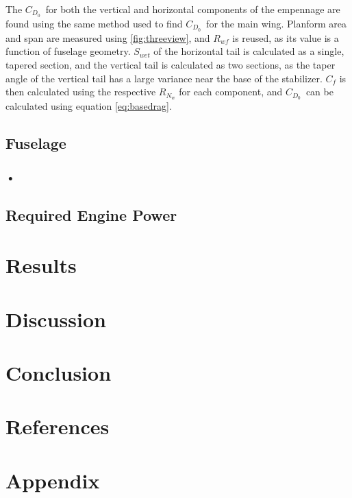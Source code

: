 \documentclass[11pt]{report}
\newcommand{\cdo}{$C_{D_0}$}
\begin{document}
The \cdo\ for both the vertical and horizontal components of the empennage are found using the same method used to find \cdo\ for the main wing. Planform area and span are measured using \ref{fig:threeview}, and $R_{wf}$ is reused, as its value is a function of fuselage geometry. $S_{wet}$ of the horizontal tail is calculated as a single, tapered section, and the vertical tail is calculated as two sections, as the taper angle of the vertical tail has a large variance near the base of the stabilizer. $C_f$ is then calculated using the respective $R_N_w$ for each component, and \cdo\ can be calculated using equation \ref{eq:basedrag}.\\

\subsection{Fuselage}





\subsubsection{•}

\subsection{Required Engine Power}

\section{Results}
 

\section{Discussion}
 

\section{Conclusion}
 

\newpage
\section{References}

\printbibliography

\section{Appendix} \label{app}
\end{document}
